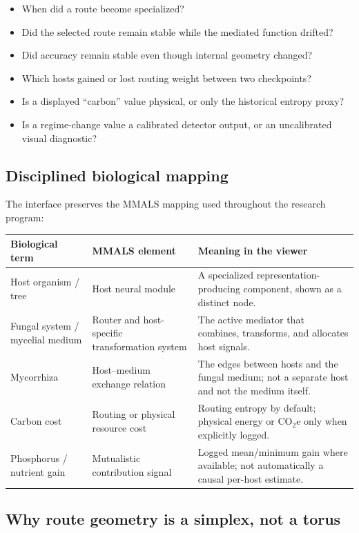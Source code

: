 \documentclass[11pt,a4paper]{article}
\begin{document}
\begin{itemize}
  \item When did a route become specialized?
  \item Did the selected route remain stable while the mediated function drifted?
  \item Did accuracy remain stable even though internal geometry changed?
  \item Which hosts gained or lost routing weight between two checkpoints?
  \item Is a displayed ``carbon'' value physical, or only the historical entropy proxy?
  \item Is a regime-change value a calibrated detector output, or an uncalibrated visual diagnostic?
\end{itemize}

\subsection{Disciplined biological mapping}

The interface preserves the MMALS mapping used throughout the research program:

\begin{table}[h]
\centering
\begin{tabularx}{\textwidth}{@{}P{35mm}P{47mm}Y@{}}
\toprule
\textbf{Biological term} & \textbf{MMALS element} & \textbf{Meaning in the viewer}\\
\midrule
Host organism / tree & Host neural module & A specialized representation-producing component, shown as a distinct node.\\
Fungal system / mycelial medium & Router and host-specific transformation system & The active mediator that combines, transforms, and allocates host signals.\\
Mycorrhiza & Host--medium exchange relation & The edges between hosts and the fungal medium; not a separate host and not the medium itself.\\
Carbon cost & Routing or physical resource cost & Routing entropy by default; physical energy or CO$_2$e only when explicitly logged.\\
Phosphorus / nutrient gain & Mutualistic contribution signal & Logged mean/minimum gain where available; not automatically a causal per-host estimate.\\
\bottomrule
\end{tabularx}
\end{table}

\subsection{Why route geometry is a simplex, not a torus}
\end{document}
